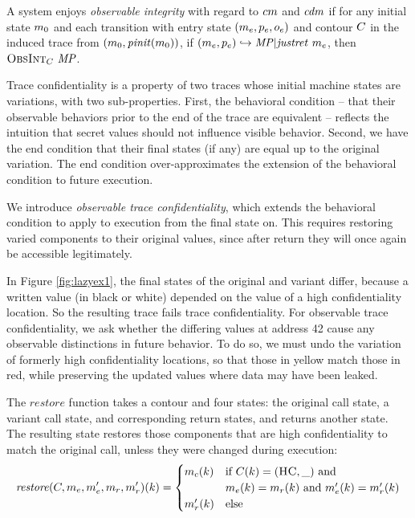 \documentclass[acmsmall,review,anonymous]{acmart}\settopmatter{printfolios=true,printccs=false,printacmref=false}
\begin{document}

      A system enjoys {\em observable integrity} with regard to \(cm\)
      and  \(\mathit{cdm}\) if for any initial state \(m_0\) and each
      transition with entry state \((m_e,p_e,o_e)\) and
      contour \(C\) in the induced trace from
      \((m_0,\mathit{pinit}(m_0))\), if
      \((m_e,p_e) \hookrightarrow \mathit{MP} | \mathit{justret}\ m_e\),
      then \(\text{\sc ObsInt}_C ~ \mathit{MP}\).


      Trace confidentiality is a property of two traces whose initial machine
      states are variations, with two sub-properties. First, the behavioral
      condition -- that their observable behaviors prior to the end of the
      trace are equivalent -- reflects the intuition that secret values should
      not influence visible behavior. Second, we have the end condition that
      their final states (if any) are equal up to the original variation. The
      end condition over-approximates the extension of the behavioral condition
      to future execution.

      We introduce {\em observable trace confidentiality}, which extends the
      behavioral condition to apply to execution from the final state on.
      This requires restoring varied components to their original values,
      since after return they will once again be accessible legitimately.

      In Figure \ref{fig:lazyex1}, the final states of the original and variant
      differ, because a written value (in black or white) depended on the value
      of a high confidentiality location. So the resulting trace fails trace
      confidentiality. For observable trace confidentiality, we ask whether the
      differing values at address 42 cause any observable distinctions in
      future behavior. To do so, we must undo the variation of formerly high
      confidentiality locations, so that those in yellow match those in red,
      while preserving the updated values where data may have been leaked.

      The \(\mathit{restore}\) function takes a contour and four states: the
      original call state, a variant call state, and corresponding return
      states, and returns another state. The resulting state restores those
      components that are high confidentiality to match the original call,
      unless they were changed during execution:
      \[\mathit{restore}(C,m_e,m_e',m_r,m_r')(k) =
        \begin{cases}
          m_c(k) & \text{if } C(k) = (\textsc{HC},\_) \text{ and } \\
                  & m_e(k) = m_r(k) \text{ and }
                    m_e'(k) = m_r'(k) \\
          m_r'(k) & \text{else} \\
        \end{cases}\]
\end{document}
